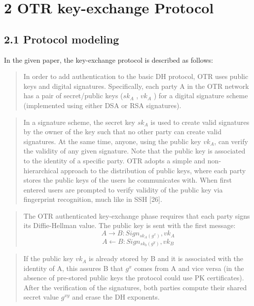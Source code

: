 \documentclass[
]{article}
\author{}
\date{}
\begin{document}
\hypertarget{otr-key-exchange-protocol}{%
\section{2 OTR key-exchange Protocol}\label{otr-key-exchange-protocol}}

\hypertarget{protocol-modeling}{%
\subsection{2.1 Protocol modeling}\label{protocol-modeling}}

In the given paper, the key-exchange protocol is described as follows:

\begin{quote}
In order to add authentication to the basic DH protocol, OTR uses public keys and digital signatures. Specifically, each party A in the OTR network has a pair of secret/public keys ($sk_A$ , $vk_A$ ) for a digital signature scheme (implemented using either DSA or RSA signatures).
\end{quote}

\begin{quote}
In a signature scheme, the secret key $sk_A$ is used to create valid signatures by the owner of the key such that no other party can create valid signatures. At the same time, anyone, using the public key $vk_A$, can verify the validity of any given signature. Note that the public key is associated to the identity of a specific party. OTR adopts a simple and non-hierarchical approach to the distribution of public keys, where each party stores the public keys of the users he communicates with. When first entered users are prompted to verify validity of the public key via fingerprint recognition, much like in SSH {[}26{]}.
\end{quote}

\begin{quote}
The OTR authenticated key-exchange phase requires that each party signs its Diffie-Hellman value. The public key is sent with the first message:
\begin{displaymath}
A \rightarrow B : Sign_{sk_A(g^x)}, vk_A
\end{displaymath}
\begin{displaymath}
A \leftarrow B : Sign_{sk_b(g^y)}, vk_B
\end{displaymath}
\end{quote}

\begin{quote}
If the public key $vk_A$ is already stored by B and it is associated with the identity of A, this assures B that $g^x$ comes from A and vice versa (in the absence of pre-stored public keys the protocol could use PK certificates). After the verification of the signatures, both parties compute their shared secret value $g^{xy}$ and erase the DH exponents.
\end{quote}
\end{document}
